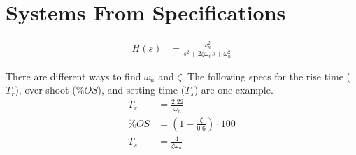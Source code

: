 \documentclass{article}
\newcommand{\sincludepdf}[2][]{
	
}
\begin{document}

\sincludepdf[pages={1},
		pagecommand=\section{Laplace Transform}\subsection*{Example 1}
	]{scan/11211301.pdf}

\section{Systems From Specifications}

\begin{align}
	H(s) &= \frac{\omega_n^2}{s^2 + 2 \zeta \omega_n s + \omega_n^2}
\end{align}

There are different ways to find $\omega_n$ and $\zeta$.
The following specs for the rise time ($T_r$), over shoot ($\%OS$),
and setting time ($T_s$) are one example.
\begin{align*}
	T_r &= \frac{2.22}{\omega_n} \\
	\%OS &= \left( 1 - \frac{\zeta}{0.6} \right) \cdot 100 \\
	T_s &= \frac{4}{\zeta \omega_n}
\end{align*}

\sincludepdf[pages={3},
			pagecommand=\subsection*{Example 1}\label{sfs:ex1},
		]{scan/11221301.pdf}

\sincludepdf[pages={3},
		pagecommand=\section{Final Value Theorem}
		]{scan/11241301.pdf}

\sincludepdf[pages={2},
	pagecommand=\section{Pole Placement (S-Domain)}\label{sec:pp}\subsection*{Example 1}\label{sec:pp:ex1}
	]{scan/11231301.pdf}
\sincludepdf[pages={3}]{scan/11231301.pdf}
\end{document}
